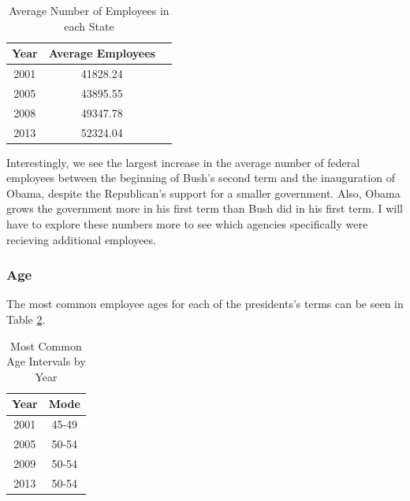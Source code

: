 \documentclass{article}
\begin{document}
            \begin{center}
                \begin{table}
                    \centering
                    \begin{tabular}{ |c|c|c| }
                        \hline
                        Year & Average Employees \\
                        \hline
                        2001 & 41828.24 \\
                        2005 & 43895.55 \\
                        2008 & 49347.78 \\
                        2013 & 52324.04 \\
                        \hline
                    \end{tabular}
                    \caption{Average Number of Employees in each State}
                    \label{tab:7}
                \end{table}
            \end{center}

        Interestingly, we see the largest increase in the average number of federal employees between the beginning of Bush's second term and the inauguration of Obama, despite the Republican's support for a smaller government. Also, Obama grows the government more in his first term than Bush did in his first term. I will have to explore these numbers more to see which agencies specifically were recieving additional employees.

        \subsubsection{Age}
        The most common employee ages for each of the presidents's terms can be seen in Table \ref{tab:8}.

            \begin{center}
                \begin{table}
                    \centering
                    \begin{tabular}{ |c|c| }
                        \hline
                        Year & Mode \\
                        \hline
                        2001 & 45-49 \\
                        2005 & 50-54 \\
                        2009 & 50-54 \\
                        2013 & 50-54 \\
                        \hline
                    \end{tabular}
                    \caption{Most Common Age Intervals by Year}
                    \label{tab:8}
                \end{table}
            \end{center}
\end{document}
